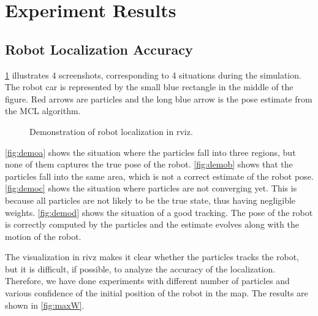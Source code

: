 \section{Experiment Results}
\subsection{Robot Localization Accuracy}

\Fig \ref{fig:demo} illustrates 4 screenshots, corresponding to 4 situations
during the simulation.
The robot car is represented by the small blue rectangle in the middle of the
figure. Red arrows are particles and the long blue arrow is the pose estimate
from the MCL algorithm.

\begin{figure}[!h]
  \hfil
  \hfil
  \hfil
  \caption{Demonstration of robot localization in rviz.}
  \label{fig:demo}
\end{figure}

\Fig \ref{fig:demoa} shows the situation where the particles fall into three
regions, but none of them captures the true pose of the robot.
\Fig \ref{fig:demob} shows that the particles fall into the same area, which
is not a correct estimate of the robot pose.
\Fig \ref{fig:democ} shows the situation where particles are not converging yet.
This is because all particles are not likely to be the true state, thus having
negligible weights.
\Fig \ref{fig:demod} shows the situation of a good tracking.
The pose of the robot is correctly computed by the particles and the estimate
evolves along with the motion of the robot.

The visualization in rivz makes it clear whether the particles tracks the robot,
but it is difficult, if possible, to analyze the accuracy of the localization.
Therefore, we have done experiments with different number of particles and
various confidence of the initial position of the robot in the map.
The results are shown in \Fig \ref{fig:maxW}.


